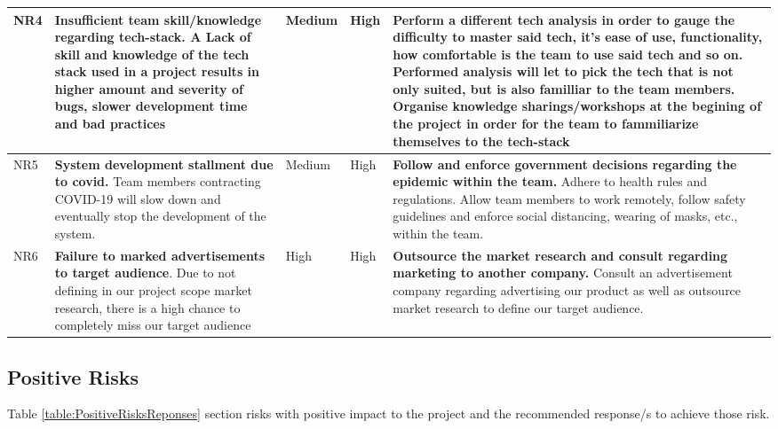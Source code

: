 \documentclass{VUMIFPSkursinis}
\begin{document}
\begin{center}
\begin{longtable}{|C{1cm}|L{4.55cm}|C{2cm}|C{2cm}|L{4.55cm}|}
		NR4 &
		\textbf{Insufficient team skill/knowledge regarding tech-stack}. A Lack of skill and knowledge of the tech stack used in a project results in higher amount and severity of bugs, slower development time and bad practices&
		Medium&
		High&
		Perform a different tech analysis in order to gauge the difficulty to master said tech, it's ease of use, functionality, how comfortable is the team to use said tech and so on. Performed analysis will let to pick the tech that is not only suited, but is also familliar to the team members.
		Organise knowledge sharings/workshops at the begining of the project in order for the team to fammiliarize themselves to the tech-stack\\ \hline	
		NR5 &
		\textbf{System development stallment due to covid.} Team members contracting COVID-19 will slow down and eventually stop the development of the system.&
		Medium&
		High&
		\textbf{Follow and enforce government decisions regarding the epidemic within the team.} Adhere to health rules and regulations. Allow team members to work remotely, follow safety guidelines and enforce social distancing, wearing of masks, etc., within the team.\\ \hline 
		NR6 &
		\textbf{Failure to marked advertisements to target audience}. Due to not defining in our project scope market research, there is a high chance to completely miss our target audience	 &
		High &
		High &
		\textbf{Outsource the market research and consult regarding marketing to another company.} Consult an advertisement company regarding advertising our product as well as outsource market research to define our target audience.  \\ \hline
	\end{longtable}
\end{center}


\subsection{Positive Risks}
Table \ref{table:PositiveRisksReponses} section risks with positive impact to the project and the recommended response/s to achieve those risk.
\end{document}
